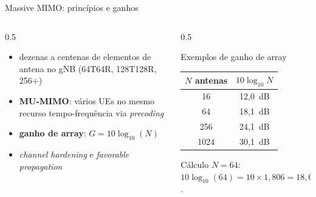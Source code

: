 \documentclass[aspectratio=169,11pt]{beamer}
\begin{document}
\begin{frame}{Massive MIMO: princípios e ganhos}
  \begin{columns}
    \begin{column}{0.5\textwidth}
      \begin{itemize}
        \item dezenas a centenas de elementos de antena no gNB (64T64R, 128T128R, 256+)
        \item \textbf{MU-MIMO}: vários UEs no mesmo recurso tempo-frequência via \emph{precoding}
        \item \textbf{ganho de array}: $G = 10\log_{10}(N)$
        \item \emph{channel hardening} e \emph{favorable propagation}
      \end{itemize}
    \end{column}
    \begin{column}{0.5\textwidth}
      \begin{block}{Exemplos de ganho de array}
        \begin{center}
          \begin{tabular}{@{}cc@{}}
            \toprule
            $N$ antenas & $10\log_{10}N$\\
            \midrule
            16 & 12,0~dB\\
            64 & 18,1~dB\\
            256 & 24,1~dB\\
            1024 & 30,1~dB\\
            \bottomrule
          \end{tabular}
        \end{center}
      \end{block}
      \begin{exampleblock}{Cálculo}
        $N=64$: $10\log_{10}(64)=10\times 1{,}806=18{,}06~\text{dB}\approx \mathbf{18~dB}$.
      \end{exampleblock}
    \end{column}
  \end{columns}
\end{frame}
\end{document}
